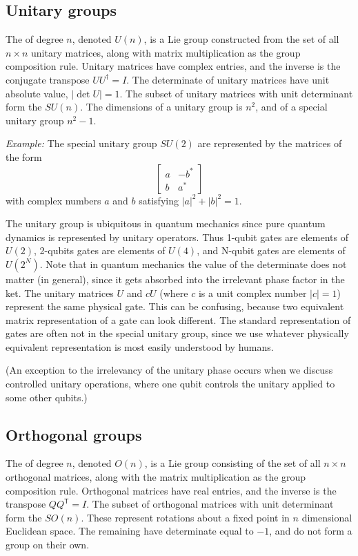 \subsection{Unitary groups}
The  of degree $n$, denoted $U(n)$, is a Lie group constructed from the set of all $n\times n$ unitary matrices, along with  matrix multiplication as the group composition rule. Unitary matrices have complex entries, and the inverse is the conjugate transpose $UU^\dagger=I$. The determinate of unitary matrices have unit absolute value, $|\det U|=1$. The subset of unitary matrices with unit determinant form the  $SU(n)$. The dimensions of a unitary group is $n^2$, and of a special unitary group $n^2-1$.


{\sl Example:} The special unitary group $SU(2)$ are represented by the matrices of the form
\[
\begin{bmatrix}
a & -b^* \\
b & a^*
\end{bmatrix}
\]
with complex numbers $a$ and $b$ satisfying $|a|^2 + |b|^2 = 1$.

The unitary group is ubiquitous in quantum mechanics since pure quantum dynamics is represented by unitary operators. Thus 1-qubit gates are elements of $U(2)$, 2-qubits gates are elements of $U(4)$, and N-qubit gates are elements of $U(2^N)$. Note that in quantum mechanics the value of the determinate does not matter (in general), since it gets absorbed into the irrelevant phase factor in the ket. The unitary matrices $U$ and $cU$ (where $c$ is a unit complex number $|c|=1$) represent the same physical gate. This can be confusing, because two equivalent matrix representation of a gate can look different. The standard representation of gates are often not in the special unitary group, since we use whatever physically equivalent representation is most easily understood by humans.

(An exception to the irrelevancy of the unitary phase occurs when we discuss controlled unitary operations, where one qubit controls the unitary applied to some other qubits.)


\newcommand{\T}{\mathsf{T}}

\subsection{Orthogonal groups}
The  of degree $n$, denoted $O(n)$, is a Lie group consisting of the set of all $n\times n$ orthogonal matrices, along with the matrix multiplication as the group composition rule. Orthogonal matrices have real entries, and the inverse is the transpose $QQ^\T=I$. The subset of orthogonal matrices with unit determinant form the  $SO(n)$. These represent rotations about a fixed point in $n$ dimensional Euclidean space. The remaining  have determinate equal to $-1$, and do not form a group on their own.


